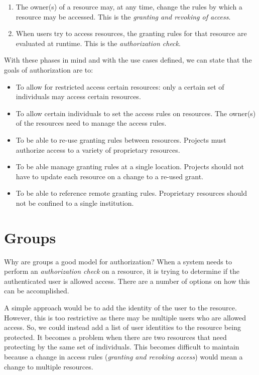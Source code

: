 \documentclass[11pt,a4paper]{ivoa}
\begin{document}
\begin{enumerate}
\item The owner(s) of a resource may, at any time, change the rules by which a resource may be accessed. This is the \emph{granting and revoking of access}.
\item When users try to access resources, the granting rules for that resource are evaluated at runtime. This is the \emph{authorization check}.
\end{enumerate}

With these phases in mind and with the use cases defined, we can state that the goals of authorization are to:

\begin{itemize}
\item To allow for restricted access certain resources: only a certain set of individuals may access certain resources.
\item To allow certain individuals to set the access rules on resources.  The owner(s) of the resources need to manage the access rules.
\item To be able to re-use granting rules between resources.  Projects must authorize access to a variety of proprietary resources.
\item To be able manage granting rules at a single location.  Projects should not have to update each resource on a change to a re-used grant.
\item To be able to reference remote granting rules.  Proprietary resources should not be confined to a single institution.
\end{itemize}

\section{Groups}

Why are groups a good model for authorization?  When a system needs to perform an \emph{authorization check} on a resource, it is trying to determine if the authenticated user is allowed access.  There are a number of options on how this can be accomplished.

A simple approach would be to add the identity of the user to the resource.  However, this is too restrictive as there may be multiple users who are allowed access.  So, we could instead add a list of user identities to the resource being protected.  It becomes a problem when there are two resources that need protecting by the same set of individuals.  This becomes difficult to maintain because a change in access rules (\emph{granting and revoking access}) would mean a change to multiple resources.
\end{document}
